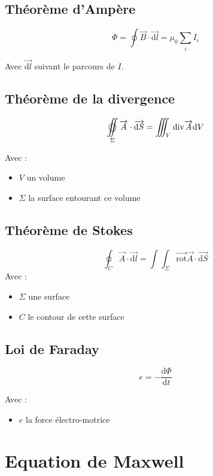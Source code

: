 \documentclass[a4paper, 11pt]{article}
\newcommand{\ve}{\overrightarrow}
\newcommand{\fint}{%
        \setbox0=\hbox{$\displaystyle \int\!\!\!\!\!\int$}
        \setbox1=\hbox to \wd0{\hfill$\bigcirc$\hfill}
        \setbox0=\hbox to \wd0{\copy0\hss\copy1}
        \mathop{\copy0}
    }
\newcommand{\tint}{\int\!\!\!\!\!\int\!\!\!\!\!\int}
\newcommand{\dint}{\int\!\!\!\!\!\int}
\newcommand{\dv}{\mathrm{div}}
\begin{document}
    \subsection{Théorème d'Ampère}

    $$\Phi = \oint\ve{B}\cdot\ve{\mathrm{d}l} = \mu_0\sum_iI_i$$

    Avec $\ve{\mathrm{d}l}$ suivant le parcours de $I$.

    \subsection{Théorème de la divergence}

    $$\fint_\Sigma\ve{A}\cdot\ve{\mathrm{d}S} = \tint_V\dv\ve{A}\mathrm{d}V$$

    Avec :
    \begin{itemize}
        \item $V$ un volume
        \item $\Sigma$ la surface entourant ce volume
    \end{itemize}

    \subsection{Théorème de Stokes}

    $$\oint_C\ve{A}\cdot\ve{\mathrm{d}l} = \dint_{\Sigma}\ve{\mathrm{rot}}\ve{A}\cdot\ve{\mathrm{d}S}$$
    Avec :
    \begin{itemize}
        \item $\Sigma$ une surface
        \item $C$ le contour de cette surface
    \end{itemize}

    \subsection{Loi de Faraday}

    $$ e = - \frac{\mathrm{d}\Phi}{\mathrm{d}t}$$

    Avec :
    \begin{itemize}
        \item $e$ la force électro-motrice
    \end{itemize}

    \section{Equation de Maxwell}
\end{document}

